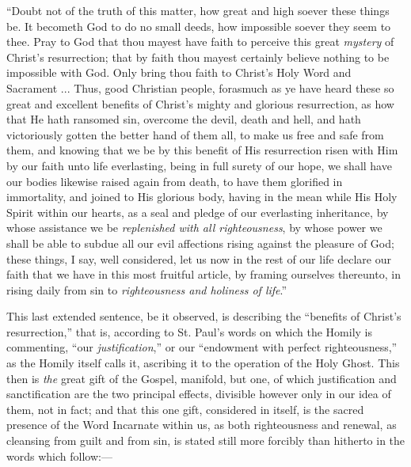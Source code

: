 ``Doubt not of the truth of this matter, how great and high
soever these things be. It becometh God to do no small deeds, how
impossible soever they seem to thee. Pray to God that thou mayest have
faith to perceive this great \emph{mystery} of Christ's resurrection; that by
faith thou mayest certainly believe nothing to be impossible with God.
Only bring thou faith to Christ's Holy Word and Sacrament ... Thus,
good Christian people, forasmuch as ye have heard these so great and
excellent benefits of Christ's mighty and glorious resurrection, as
how that He hath ransomed sin, overcome the devil, death and hell, and
hath victoriously gotten the better hand of them all, to make us free
and safe from them, and knowing that we be by this benefit of His
resurrection risen with Him by our faith unto life everlasting, being
in full surety of our hope, we shall have our bodies likewise raised
again from death, to have them glorified in immortality, and joined to
His glorious body, having in the mean while His Holy Spirit within our
hearts, as a seal and pledge of our everlasting inheritance, by whose
assistance we be \emph{replenished with all righteousness}, by whose
power we shall be able to subdue all our evil affections rising
against the pleasure of God; these things, I say, well considered, let
us now in the rest of our life declare our faith that we have in this
most fruitful article, by framing ourselves thereunto, in rising daily
from sin to \emph{righteousness and holiness of life}.''

This last extended sentence, be it observed, is describing the
``benefits of Christ's resurrection,'' that is, according to
St. Paul's words on which the Homily is commenting, ``our \emph{justification},''
or our ``endowment with perfect righteousness,'' as the Homily
itself calls it, ascribing it to the operation of the Holy Ghost. This
then is \emph{the} great gift of the Gospel, manifold, but one, of
which justification and sanctification are the two principal effects,
divisible however only in our idea of them, not in fact; and that this
one gift, considered in itself, is the sacred presence of the Word
Incarnate within us, as both righteousness and renewal, as cleansing
from guilt and from sin, is stated still more forcibly than hitherto
in the words which follow:—

